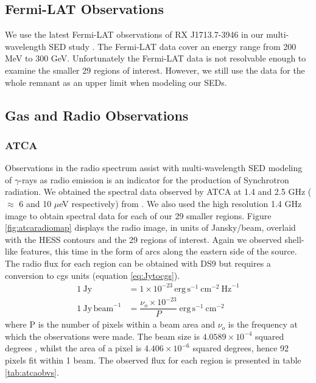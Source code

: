 \documentclass[12pt,a4paper]{article}
\begin{document}
\subsection{Fermi-LAT Observations}
We use the latest Fermi-LAT observations of RX J1713.7-3946 in our multi-wavelength SED study \citep{2011ApJ...734...28A}. The Fermi-LAT data cover an energy range from 200 MeV to 300 GeV. Unfortunately the Fermi-LAT data is not resolvable enough to examine the smaller 29 regions of interest. However, we still use the data for the whole remnant as an upper limit when modeling our SEDs. 

\subsection{Gas and Radio Observations}
\subsubsection{ATCA}
Observations in the radio spectrum assist with multi-wavelength SED modeling of $\gamma$-rays as radio emission is an indicator for the production of Synchrotron radiation. We obtained the spectral data observed by ATCA at 1.4 and 2.5 GHz ($\approx$ 6 and 10 $\mu$eV respectively) from  \cite{2004ApJ...602..271L}. We also used the high resolution 1.4 GHz image to obtain spectral data for each of our 29 smaller regions. Figure \ref{fig:atcaradiomap} displays the radio image, in units of Jansky/beam, overlaid with the HESS contours and the 29 regions of interest. Again we observed shell-like features, this time in the form of arcs along the eastern side of the source. The radio flux for each region can be obtained with DS9 but requires a conversion to cgs units (equation \ref{eq:Jytocgs}).
\begin{equation} \label{eq:Jytocgs}
\begin{split}
1 \ \mathrm{Jy} &= 1 \times 10^{-23} \, \mathrm{erg \, s}^{-1} \ \mathrm{cm}^{-2} \ \mathrm{Hz}^{-1} \\
1  \ \mathrm{Jy\, beam}^{-1} &= \dfrac{\nu_o \times 10^{-23}}{P}  \ \mathrm{erg \, s}^{-1} \ \mathrm{cm}^{-2}
\end{split}
\end{equation}
where P is the number of pixels within a beam area and $\nu_o$ is the frequency at which the observations were made. The beam size is $4.0589 \times 10^{-4}$ squared degrees \citep{2004ApJ...602..271L}, whilst the area of a pixel is $4.406 \times 10^{-6}$ squared degrees, hence 92 pixels fit within 1 beam. The observed flux for each region is presented in table \ref{tab:atcaobvs}.
\end{document}
